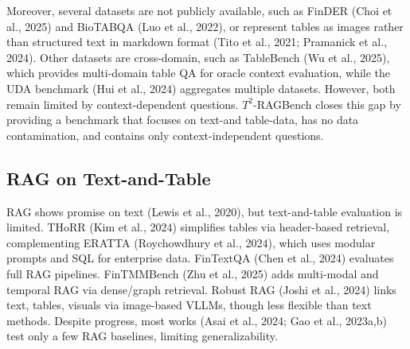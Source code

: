 \documentclass[10pt]{article}
\begin{document}
Moreover, several datasets are not publicly available, such as FinDER (Choi et al., 2025) and BioTABQA (Luo et al., 2022), or represent tables as images rather than structured text in markdown format (Tito et al., 2021; Pramanick et al., 2024). Other datasets are cross-domain, such as TableBench (Wu et al., 2025), which provides multi-domain table QA for oracle context evaluation, while the UDA benchmark (Hui et al., 2024) aggregates multiple datasets. However, both remain limited by context-dependent questions. $T^{2}$-RAGBench closes this gap by providing a benchmark that focuses on text-and table-data, has no data contamination, and contains only context-independent questions.

\subsection*{RAG on Text-and-Table}
RAG shows promise on text (Lewis et al., 2020), but text-and-table evaluation is limited. THoRR (Kim et al., 2024) simplifies tables via header-based retrieval, complementing ERATTA (Roychowdhury et al., 2024), which uses modular prompts and SQL for enterprise data. FinTextQA (Chen et al., 2024) evaluates full RAG pipelines. FinTMMBench (Zhu et al., 2025) adds multi-modal and temporal RAG via dense/graph retrieval. Robust RAG (Joshi et al., 2024) links text, tables, visuals via image-based VLLMs, though less flexible than text methods. Despite progress, most works (Asai et al., 2024; Gao et al., 2023a,b) test only a few RAG baselines, limiting generalizability.
\end{document}
